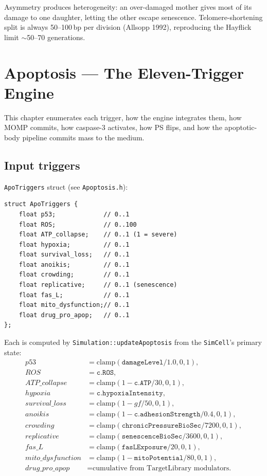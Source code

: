\documentclass[11pt,letterpaper,twoside,openany]{book}
\newcommand{\code}[1]{\texttt{#1}}
\newcommand{\file}[1]{\texttt{\small#1}}
\begin{document}
Asymmetry produces heterogeneity: an over-damaged mother gives most
of its damage to one daughter, letting the other escape senescence.
Telomere-shortening split is always 50--100\,bp per division
(Allsopp 1992), reproducing the Hayflick limit $\sim$50--70
generations.

\chapter{Apoptosis --- The Eleven-Trigger Engine}
\label{ch:apoptosis-deep}

This chapter enumerates each trigger, how the engine integrates
them, how MOMP commits, how caspase-3 activates, how PS flips, and
how the apoptotic-body pipeline commits mass to the medium.

\section{Input triggers}

\code{ApoTriggers} struct (see \file{Apoptosis.h}):
\begin{lstlisting}
struct ApoTriggers {
    float p53;             // 0..1
    float ROS;             // 0..100
    float ATP_collapse;    // 0..1 (1 = severe)
    float hypoxia;         // 0..1
    float survival_loss;   // 0..1
    float anoikis;         // 0..1
    float crowding;        // 0..1
    float replicative;     // 0..1 (senescence)
    float fas_L;           // 0..1
    float mito_dysfunction;// 0..1
    float drug_pro_apop;   // 0..1
};
\end{lstlisting}

Each is computed by \code{Simulation::updateApoptosis} from the
\code{SimCell}'s primary state:
\begin{align*}
  p53 &= \mathrm{clamp}(\code{damageLevel}/1.0, 0, 1),\\
  ROS &= \code{c.ROS},\\
  ATP\_collapse &= \mathrm{clamp}(1 - \code{c.ATP}/30, 0, 1),\\
  hypoxia &= \code{c.hypoxiaIntensity},\\
  survival\_loss &= \mathrm{clamp}(1 - gf/50, 0, 1),\\
  anoikis &= \mathrm{clamp}(1 - \code{c.adhesionStrength}/0.4, 0, 1),\\
  crowding &= \mathrm{clamp}(\code{chronicPressureBioSec}/7200, 0, 1),\\
  replicative &= \mathrm{clamp}(\code{senescenceBioSec}/3600, 0, 1),\\
  fas\_L &= \mathrm{clamp}(\code{fasLExposure}/20, 0, 1),\\
  mito\_dysfunction &= \mathrm{clamp}(1 - \code{mitoPotential}/80, 0, 1),\\
  drug\_pro\_apop &= \text{cumulative from TargetLibrary modulators.}
\end{align*}
\end{document}
